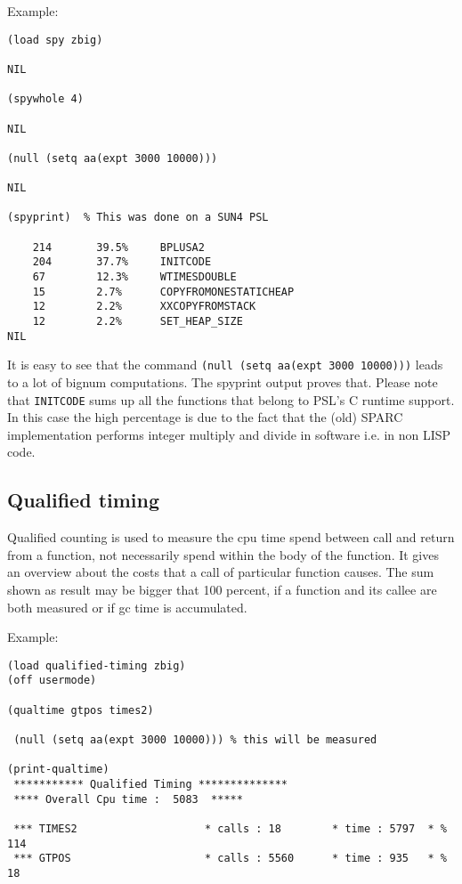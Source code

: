 
Example:
\begin{verbatim}
(load spy zbig)

NIL

(spywhole 4)

NIL

(null (setq aa(expt 3000 10000)))

NIL

(spyprint)  % This was done on a SUN4 PSL

	214       39.5%     BPLUSA2
	204       37.7%     INITCODE
	67        12.3%     WTIMESDOUBLE
	15        2.7%      COPYFROMONESTATICHEAP
	12        2.2%      XXCOPYFROMSTACK
	12        2.2%      SET_HEAP_SIZE
NIL
\end{verbatim}

It is easy to see that the command \verb+(null (setq aa(expt 3000 10000)))+
leads to a lot of bignum computations. The spyprint output proves that.
Please note that \verb+INITCODE+ sums up all the functions that belong
to PSL's C runtime support. In this case the high percentage is due
to the fact that the (old) SPARC implementation performs integer
multiply and divide in software i.e. in non LISP code.

\subsection{Qualified timing}           

Qualified counting is used to measure the cpu time spend between
call and return from a function, not necessarily spend within the 
body of the function. It gives an overview about the costs that
a call of particular function causes. The sum shown as result may
be bigger that 100 percent, if a function and its callee are both
measured or if gc time is accumulated.
\\



Example:

\begin{verbatim}
(load qualified-timing zbig)
(off usermode)

(qualtime gtpos times2)

 (null (setq aa(expt 3000 10000))) % this will be measured

(print-qualtime)
 *********** Qualified Timing **************
 **** Overall Cpu time :  5083  *****

 *** TIMES2                    * calls : 18        * time : 5797  * % 114
 *** GTPOS                     * calls : 5560      * time : 935   * % 18

\end{verbatim}

